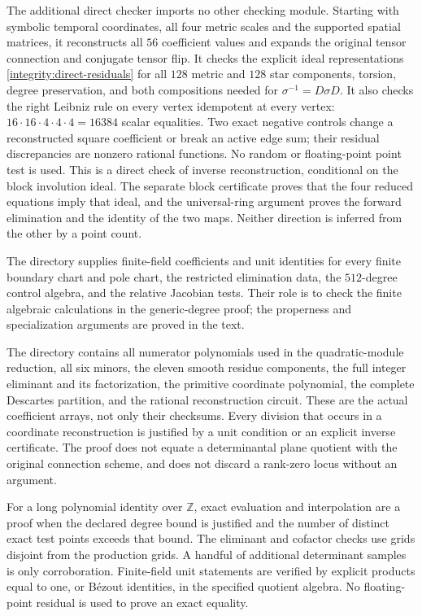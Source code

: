 \documentclass[11pt,a4paper]{article}
\theoremstyle{remark}\newtheorem{remark}[theorem]{Remark}
\begin{document}
The additional direct checker 
imports no other checking module. Starting with symbolic temporal
coordinates, all four metric scales and the supported spatial matrices,
it reconstructs all $56$ coefficient values and expands the original
tensor connection and conjugate tensor flip. It checks the explicit
ideal representations \eqref{integrity:direct-residuals} for all $128$
metric and $128$ star components, torsion, degree preservation, and
both compositions needed for $\sigma^{-1}=D\sigma D$.
It also checks the right Leibniz rule on every vertex idempotent at
every vertex: $16\cdot16\cdot4\cdot4\cdot4=16384$ scalar equalities.
Two exact negative controls change a reconstructed square coefficient
or break an active edge sum; their residual discrepancies are nonzero
rational functions. No random or floating-point point test is used.
This is a direct check of inverse reconstruction, conditional on the
block involution ideal. The separate block certificate proves that
the four reduced equations imply that ideal, and the universal-ring
argument proves the forward elimination and the identity of the two
maps. Neither direction is inferred from the other by a point count.

The directory  supplies finite-field
coefficients and unit identities for every finite boundary chart and
pole chart, the restricted elimination data, the $512$-degree control
algebra, and the relative Jacobian tests. Their role is to check the
finite algebraic calculations in the generic-degree proof; the
properness and specialization arguments are proved in the text.

The directory  contains all numerator
polynomials used in the quadratic-module reduction, all six minors,
the eleven smooth residue components, the full integer eliminant and
its factorization, the primitive coordinate polynomial, the complete
Descartes partition, and the rational reconstruction circuit. These are
the actual coefficient arrays, not only their checksums.
Every division that occurs in a coordinate reconstruction is justified
by a unit condition or an explicit inverse certificate. The proof does
not equate a determinantal plane quotient with the original connection
scheme, and does not discard a rank-zero locus without an argument.

For a long polynomial identity over $\mathbb Z$, exact evaluation and
interpolation are a proof when the declared degree bound is justified
and the number of distinct exact test points exceeds that bound.
The eliminant and cofactor checks use grids disjoint from the production
grids. A handful of additional determinant samples is only
corroboration. Finite-field unit statements are verified by explicit
products equal to one, or B\'ezout identities, in the specified quotient
algebra. No floating-point residual is used to prove an exact equality.
\end{document}
